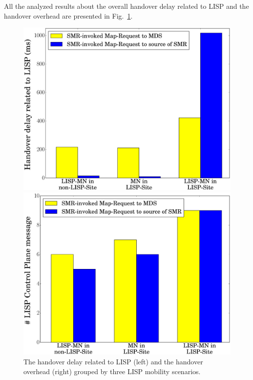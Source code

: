 All the analyzed results about the overall handover delay related to LISP and the handover overhead are presented in Fig.~\ref{handover_delay_overhead_bar}.
\begin{figure}[!t]
	\begin{minipage}[c]{.5\linewidth}
		\begin{center}
			\includegraphics[width=\linewidth]{Pics/LISP_handover_delay_Bar.eps}
		\end{center}
	\end{minipage}
	\begin{minipage}[c]{.5\linewidth}
		\begin{center}
			\includegraphics[width=\linewidth]{Pics/LISP_handover_overhead_Bar}
		\end{center}
	\end{minipage}
	\caption{The handover delay related to LISP (left) and the handover overhead (right) grouped by three LISP mobility scenarios.}
	\label{handover_delay_overhead_bar}
\end{figure}


